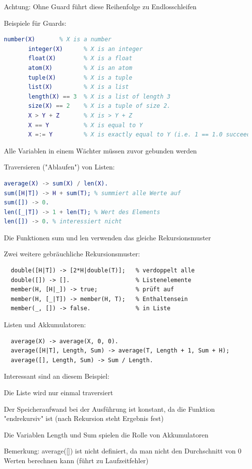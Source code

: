 \documentclass[10pt]{article}
\begin{document}
\begin{itemize*}
\begin{itemize*}
\begin{itemize*}
      \item Achtung: Ohne Guard führt diese Reihenfolge zu Endlosschleifen
    \end{itemize*}
    \item Beispiele für Guards:
    \begin{lstlisting}[language=erlang]
       number(X)       % X is a number
       integer(X)      % X is an integer
       float(X)        % X is a float
       atom(X)         % X is an atom
       tuple(X)        % X is a tuple
       list(X)         % X is a list
       length(X) == 3  % X is a list of length 3
       size(X) == 2    % X is a tuple of size 2.
       X > Y + Z       % X is > Y + Z
       X == Y          % X is equal to Y
       X =:= Y         % X is exactly equal to Y (i.e. 1 == 1.0 succeeds but 1 =:= 1.0 fails)
    \end{lstlisting}
    \item Alle Variablen in einem Wächter müssen zuvor gebunden werden
  \end{itemize*}
\end{itemize*}

Traversieren ("Ablaufen") von Listen:
\begin{lstlisting}[language=erlang]
average(X) -> sum(X) / len(X).
sum([H|T]) -> H + sum(T); % summiert alle Werte auf
sum([]) -> 0.
len([_|T]) -> 1 + len(T); % Wert des Elements
len([]) -> 0. % interessiert nicht
\end{lstlisting}
\begin{itemize*}
  \item Die Funktionen sum und len verwenden das gleiche Rekursionsmuster
  \item Zwei weitere gebräuchliche Rekursionsmuster:
  \begin{lstlisting}
  double([H|T]) -> [2*H|double(T)];   % verdoppelt alle
  double([]) -> [].                   % Listenelemente
  member(H, [H|_]) -> true;           % prüft auf
  member(H, [_|T]) -> member(H, T);   % Enthaltensein
  member(_, []) -> false.             % in Liste
  \end{lstlisting}
\end{itemize*}

Listen und Akkumulatoren:
\begin{lstlisting}
  average(X) -> average(X, 0, 0).
  average([H|T], Length, Sum) -> average(T, Length + 1, Sum + H);
  average([], Length, Sum) -> Sum / Length.
\end{lstlisting}
\begin{itemize*}
  \item Interessant sind an diesem Beispiel:
  \item Die Liste wird nur einmal traversiert
  \item Der Speicheraufwand bei der Ausführung ist konstant, da die Funktion "endrekursiv" ist (nach Rekursion steht Ergebnis fest)
  \item Die Variablen Length und Sum spielen die Rolle von Akkumulatoren
  \item Bemerkung: average([]) ist nicht definiert, da man nicht den Durchschnitt von 0 Werten berechnen kann (führt zu Laufzeitfehler)
\end{itemize*}
\end{document}
